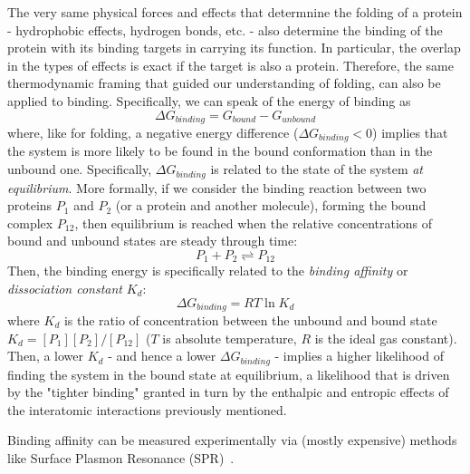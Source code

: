 The very same physical forces and effects that determnine the folding of a protein - hydrophobic effects, hydrogen bonds, etc. - 
also determine the binding of the protein with its binding targets in carrying its function. In particular, the overlap in the
types of effects is exact if the target is also a protein.
Therefore, the same thermodynamic framing that guided our understanding of folding, can also be applied to binding.
Specifically, we can speak of the energy of binding as
\begin{equation}
    \Delta G_{binding} = G_{bound} - G_{unbound}
\end{equation}
where, like for folding, a negative energy difference ($\Delta G_{binding} < 0$) implies that the system is more likely to be
found in the bound conformation than in the unbound one.
Specifically, $\Delta G_{binding}$ is related to the state of the system \textit{at equilibrium}.
More formally, if we consider the binding reaction between two proteins $P_1$ and $P_2$ (or a protein and another molecule),
forming the bound complex $P_{12}$, then equilibrium is reached when the relative concentrations of bound and unbound states
are steady through time:
\begin{equation}
    P_1 + P_2 \rightleftharpoons P_{12}
\end{equation}
Then, the binding energy is specifically related to the \textit{binding affinity} or \textit{dissociation constant} $K_d$:
\begin{equation}
    \Delta G_{binding} = R T \ln K_d
\end{equation}
where $K_d$ is the ratio of concentration between the unbound and bound state $K_d = [P_1][P_2] / [P_{12}]$
($T$ is absolute temperature, $R$ is the ideal gas constant).
Then, a lower $K_d$ - and hence a lower $\Delta G_{binding}$ - implies a higher likelihood of finding the system
in the bound state at equilibrium, a likelihood that is driven by the "tighter binding" granted in turn by the enthalpic
and entropic effects of the interatomic interactions previously mentioned.

Binding affinity can be measured experimentally via (mostly expensive) methods like Surface Plasmon Resonance (SPR)~\citep{karlsson_spr_2004}.




